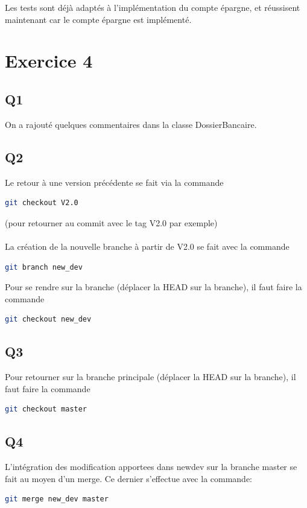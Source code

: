 \documentclass[12pt]{article}
\begin{document}
Les tests sont déjà adaptés à l'implémentation du compte épargne, et réussisent maintenant car le compte épargne est implémenté.

\section{Exercice 4}

\subsection{Q1}
On a rajouté quelques commentaires dans la classe DossierBancaire.

\subsection{Q2}

Le retour à une version précédente se fait via la commande
\begin{lstlisting}[language=bash]
git checkout V2.0
\end{lstlisting}
(pour retourner au commit avec le tag V2.0 par exemple)\\ \\
La création de la nouvelle branche à partir de V2.0 se fait avec la commande
\begin{lstlisting}[language=bash]
git branch new_dev
\end{lstlisting}
Pour se rendre sur la branche (déplacer la HEAD sur la branche), il faut faire la commande
\begin{lstlisting}[language=bash]
git checkout new_dev
\end{lstlisting}

\subsection{Q3}

Pour retourner sur la branche principale (déplacer la HEAD sur la branche), il faut faire la commande
\begin{lstlisting}[language=bash]
git checkout master
\end{lstlisting}

\subsection{Q4}

L'intégration des modification apportees dans new\textunderscore dev sur la branche master se fait au moyen d'un merge.
Ce dernier s'effectue avec la commande:
\begin{lstlisting}[language=bash]
git merge new_dev master
\end{lstlisting}
\end{document}
